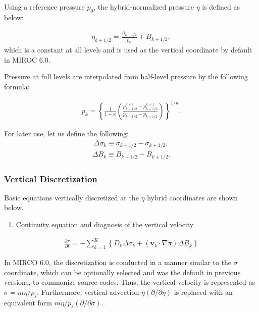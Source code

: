Using a reference pressure \(p_0\), the hybrid-normalized pressure \(\eta\) is defined as below:

\begin{eqnarray}
\eta_{k+1/2} = \frac{A_{k+1/2}}{p_0} +B_{k+1/2},  \end{eqnarray} which is a constant at all levels and is used as the vertical coordinate by default in MIROC 6.0.

Pressure at full levels are interpolated from half-level pressure by the following formula:

\begin{eqnarray}
p_k = \left\{ \frac{1}{1+\kappa}
\left( \frac{  p^{\kappa +1}_{k-1/2}
- p^{\kappa +1}_{k+1/2}      }
{ p_{k-1/2} - p_{k+1/2} }
\right)
\right\}^{1/\kappa}.
\end{eqnarray}

For later use, let us define the following: \begin{eqnarray}
\Delta\sigma_k \equiv \sigma_{k-1/2} - \sigma_{k+1/2},
\end{eqnarray} \begin{eqnarray}
  \Delta B_k \equiv B_{k-1/2} - B_{k+1/2}.\end{eqnarray}

\hypertarget{vertical-discretization-1}{%
\subsubsection{Vertical Discretization}\label{vertical-discretization-1}}

Basic equations vertically discretized at the \(\eta\) hybrid coordinates are shown below.

\begin{enumerate}
\def\labelenumi{\arabic{enumi}.}
\tightlist
\item
  Continuity equation and diagnosis of the vertical velocity
\end{enumerate}

\begin{eqnarray}
  \frac{\partial \pi}{\partial t}
 = - \sum_{k=1}^{K} \left\{ D_k \Delta\sigma_k + ({\mathbf{v}}_k \cdot \nabla \pi)\Delta B_k \right\}  \end{eqnarray}

In MIRCO 6.0, the discretization is conducted in a manner similar to the \(\sigma\) coordinate, which can be optionally selected and was the default in previous versions, to commonize source codes.
Thus, the vertical velocity is represented as \(\dot{\sigma}=m\dot{\eta}/p_s\). Furthermore, vertical advection \(\dot{\eta}(\partial/\partial\eta)\) is replaced with an equivalent form
\(m\dot{\eta}/p_s(\partial/\partial\sigma)\).

